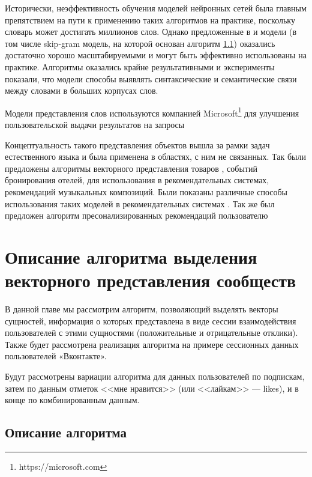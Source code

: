 \documentclass[times,specification,annotation]{itmo-student-thesis}
\begin{document}
Исторически, неэффективность обучения моделей нейронных сетей была главным препятствием на пути к применению таких алгоритмов на практике, поскольку словарь может достигать миллионов слов. Однако предложенные в \cite{mikolov2013efficient} и \cite{mikolov2013distributed} модели (в том числе skip-gram модель, на которой основан алгоритм \ref{sec:algo}) оказались достаточно хорошо масштабируемыми и могут быть эффективно использованы на практике. Алгоритмы оказались крайне результативными и эксперименты показали, что модели способы выявлять синтаксические и семантические связи между словами в больших корпусах слов. 

Модели представления слов используются компанией Microsoft\footnote{https://microsoft.com} для улучшения пользовательской выдачи результатов на запросы \cite{Nalisnick2016}

Концептуальность такого представления объектов вышла за рамки задач естественного языка и была применена в областях, с ним не связанных. Так были предложены алгоритмы векторного представления товаров \cite{grbovic2015commerce}\cite{Vasile2016}, событий бронирования отелей\cite{airbnb}, для использования в рекомендательных системах, рекомендаций музыкальных композиций\cite{cheng2017exploiting}. Были показаны различные способы использования таких моделей в рекомендательных системах \cite{ozsoy2016word}. Так же был предложен алгоритм пресонализированных рекомендаций пользователю \cite{manotumruksa2016modelling}

\finishrelatedwork

\chapter{Описание алгоритма выделения векторного представления сообществ}

В данной главе мы рассмотрим алгоритм, позволяющий выделять векторы
сущностей, информация о которых представлена в виде сессии взаимодействия
пользователей с этими сущностями (положительные и отрицательные отклики).
Также будет рассмотрена реализация алгоритма на примере сессионных данных
пользователей «Вконтакте». 

Будут рассмотрены вариации алгоритма для данных пользователей по подпискам, затем по данным отметок <<мне нравится>> (или <<лайкам>> --- likes), и в конце по комбинированным данным.

\section{Описание алгоритма}\label{sec:algo}
\end{document}
